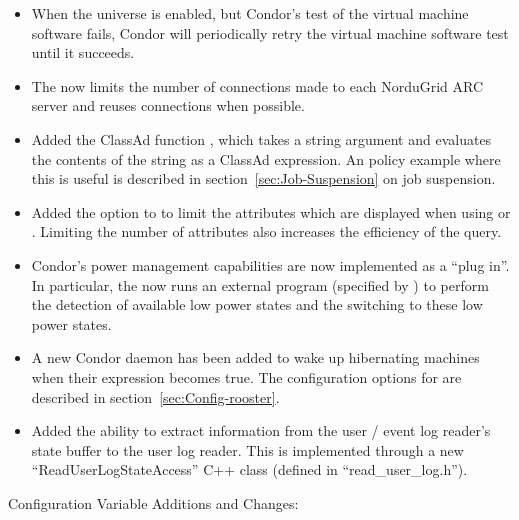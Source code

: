 \begin{itemize}
\item When the  universe is enabled,
but Condor's test of the virtual machine software fails,
Condor will periodically retry the virtual machine software test until it
succeeds.

\item The  now limits the number of connections
made to each NorduGrid ARC server and reuses connections when possible.

\item Added the ClassAd function , which takes a string
argument and evaluates the contents of the string as a ClassAd
expression.  An policy example where this is useful is described in
section~\ref{sec:Job-Suspension} on job suspension.

\item Added the option  to  to limit the
attributes which are displayed when using  or .
Limiting the number of attributes also increases the efficiency of
the query.

\item Condor's power management capabilities are now implemented as a
  ``plug in''.  In particular, the  now runs an
  external program (specified by ) to
  perform the detection of available low power states and the
  switching to these low power states.

\item A new Condor daemon  has been added to wake up
hibernating machines when their  expression
becomes true.  The configuration options for 
are described in section~\ref{sec:Config-rooster}.

\item Added the ability to extract information from the user / event log
  reader's state buffer to the user log reader.  This is implemented
  through a new
  ``ReadUserLogStateAccess'' C++ class (defined in
  ``read\_user\_log.h'').

\end{itemize}

\noindent Configuration Variable Additions and Changes:

